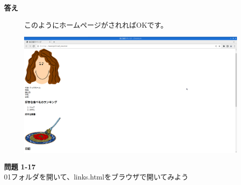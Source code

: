 \bigskip

\clearpage


\textbf{答え}



\begin{figure}[hb]
  \centering
  \begin{minipage}{\textwidth}
    このようにホームページがされればOKです。

    \centering
    \includegraphics[width=\textwidth]{text01-img/textbook-img142.png}
  \end{minipage}

\end{figure}
\noindent \textbf{問題 1-17}\\
01フォルダを開いて、links.htmlをブラウザで開いてみよう


\bigskip

\vfill

\clearpage

